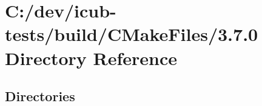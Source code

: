 \section{C\+:/dev/icub-\/tests/build/\+C\+Make\+Files/3.7.0 Directory Reference}
\label{dir_f1081893c291350f0e3f9369227bf1f3}
\subsection*{Directories}
\begin{DoxyCompactItemize}
\end{DoxyCompactItemize}
